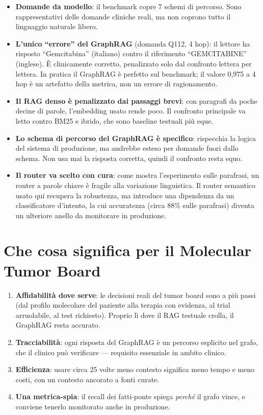 \documentclass[11pt,a4paper]{report}
\begin{document}
\begin{itemize}
  \item \textbf{Domande da modello}: il benchmark copre 7 schemi di
        percorso. Sono rappresentativi delle domande cliniche reali, ma non
        coprono tutto il linguaggio naturale libero.
  \item \textbf{L'unico ``errore'' del GraphRAG} (domanda Q112, 4 hop): il
        lettore ha risposto ``Gemcitabina'' (italiano) contro il
        riferimento ``GEMCITABINE'' (inglese). È clinicamente corretto,
        penalizzato solo dal confronto lettera per lettera. In pratica il
        GraphRAG è perfetto sul benchmark; il valore 0,975 a 4 hop è un
        artefatto della metrica, non un errore di ragionamento.
  \item \textbf{Il RAG denso è penalizzato dai passaggi brevi}: con
        paragrafi da poche decine di parole, l'embedding usato rende poco.
        Il confronto principale va letto contro BM25 e ibrido, che sono
        baseline testuali più eque.
  \item \textbf{Lo schema di percorso del GraphRAG è specifico}: rispecchia
        la logica del sistema di produzione, ma andrebbe esteso per domande
        fuori dallo schema. Non usa mai la risposta corretta, quindi il
        confronto resta equo.
  \item \textbf{Il router va scelto con cura}: come mostra l'esperimento sulle
        parafrasi, un router a parole chiave è fragile alla variazione
        linguistica. Il router semantico usato qui recupera la robustezza, ma
        introduce una dipendenza da un classificatore d'intento, la cui
        accuratezza (circa 88\% sulle parafrasi) diventa un ulteriore anello
        da monitorare in produzione.
\end{itemize}

\section{Che cosa significa per il Molecular Tumor Board}

\begin{enumerate}
  \item \textbf{Affidabilità dove serve}: le decisioni reali del tumor board
        sono a più passi (dal profilo molecolare del paziente alla terapia
        con evidenza, al trial arruolabile, al test richiesto). Proprio lì
        dove il RAG testuale crolla, il GraphRAG resta accurato.
  \item \textbf{Tracciabilità}: ogni risposta del GraphRAG è un percorso
        esplicito nel grafo, che il clinico può verificare --- requisito
        essenziale in ambito clinico.
  \item \textbf{Efficienza}: usare circa 25 volte meno contesto significa
        meno tempo e meno costi, con un contesto ancorato a fonti curate.
  \item \textbf{Una metrica-spia}: il recall dei fatti-ponte spiega
        \emph{perché} il grafo vince, e conviene tenerlo monitorato anche in
        produzione.
\end{enumerate}
\end{document}
